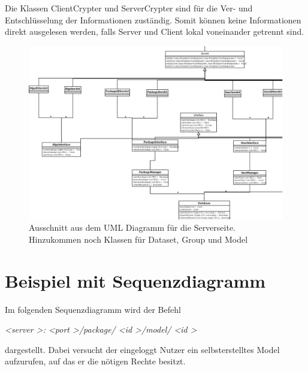 \documentclass[oneside]{book}
\begin{document}
Die Klassen ClientCrypter und ServerCrypter sind f\"ur die Ver- und Entschl\"usselung der Informationen zust\"andig. Somit k\"onnen keine Informationen direkt ausgelesen werden, falls Server und Client lokal voneinander getrennt sind. 
\begin{figure}[ht]
	\centering
	\includegraphics[scale=0.4]{server.png}
	\caption{Ausschnitt aus dem UML Diagramm f\"ur die Serverseite. Hinzukommen noch Klassen f\"ur Dataset, Group und Model}
\end{figure}



\chapter{Beispiel mit Sequenzdiagramm}

Im folgenden Sequenzdiagramm wird der Befehl 

\textit{\textless server \textgreater: \textless port \textgreater /package/ \textless id \textgreater /model/ \textless id \textgreater}  

\noindent dargestellt. Dabei versucht der eingeloggt Nutzer ein selbsterstelltes Model aufzurufen, auf das er die n\"otigen Rechte besitzt.
\end{document}
